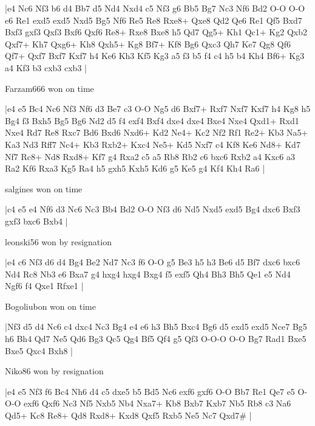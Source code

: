 \makegametitle
|e4 Nc6 Nf3 b6 d4 Bb7 d5 Nd4 Nxd4 c5 Nf3 g6 Bb5 Bg7 Nc3 Nf6 Bd2 O-O O-O e6 Re1 exd5 exd5 Nxd5 Bg5 Nf6 Re5 Re8 Rxe8+ Qxe8 Qd2 Qe6 Re1 Qf5 Bxd7 Bxf3 gxf3 Qxf3 Bxf6 Qxf6 Re8+ Rxe8 Bxe8 h5 Qd7 Qg5+ Kh1 Qc1+ Kg2 Qxb2 Qxf7+ Kh7 Qxg6+ Kh8 Qxh5+ Kg8 Bf7+ Kf8 Bg6 Qxc3 Qh7 Ke7 Qg8 Qf6 Qf7+ Qxf7 Bxf7 Kxf7 h4 Ke6 Kh3 Kf5 Kg3 a5 f3 b5 f4 c4 h5 b4 Kh4 Bf6+ Kg3 a4 Kf3 b3 cxb3 cxb3  |

\showboard

Farzam666 won on time

\makegametitle
|e4 e5 Bc4 Nc6 Nf3 Nf6 d3 Be7 c3 O-O Ng5 d6 Bxf7+ Rxf7 Nxf7 Kxf7 h4 Kg8 h5 Bg4 f3 Bxh5 Bg5 Bg6 Nd2 d5 f4 exf4 Bxf4 dxe4 dxe4 Bxe4 Nxe4 Qxd1+ Rxd1 Nxe4 Rd7 Re8 Rxc7 Bd6 Bxd6 Nxd6+ Kd2 Ne4+ Kc2 Nf2 Rf1 Re2+ Kb3 Na5+ Ka3 Nd3 Rff7 Nc4+ Kb3 Rxb2+ Kxc4 Ne5+ Kd5 Nxf7 c4 Kf8 Ke6 Nd8+ Kd7 Nf7 Rc8+ Nd8 Rxd8+ Kf7 g4 Rxa2 c5 a5 Rb8 Rb2 c6 bxc6 Rxb2 a4 Kxc6 a3 Ra2 Kf6 Rxa3 Kg5 Ra4 h5 gxh5 Kxh5 Kd6 g5 Ke5 g4 Kf4 Kh4 Ra6  |

\showboard

salgines won on time

\makegametitle
|c4 e5 e4 Nf6 d3 Nc6 Nc3 Bb4 Bd2 O-O Nf3 d6 Nd5 Nxd5 exd5 Bg4 dxc6 Bxf3 gxf3 bxc6 Bxb4  |

\showboard

leonski56 won by resignation

\makegametitle
|e4 c6 Nf3 d6 d4 Bg4 Be2 Nd7 Nc3 f6 O-O g5 Be3 h5 h3 Be6 d5 Bf7 dxc6 bxc6 Nd4 Rc8 Nb3 e6 Bxa7 g4 hxg4 hxg4 Bxg4 f5 exf5 Qh4 Bh3 Bh5 Qe1 e5 Nd4 Ngf6 f4 Qxe1 Rfxe1  |

\showboard

Bogoliubon won on time

\makegametitle
|Nf3 d5 d4 Nc6 c4 dxc4 Nc3 Bg4 e4 e6 h3 Bh5 Bxc4 Bg6 d5 exd5 exd5 Nce7 Bg5 h6 Bh4 Qd7 Ne5 Qd6 Bg3 Qc5 Qg4 Bf5 Qf4 g5 Qf3 O-O-O O-O Bg7 Rad1 Bxe5 Bxe5 Qxc4 Bxh8  |

\showboard

Niko86 won by resignation

\makegametitle
|e4 e5 Nf3 f6 Bc4 Nh6 d4 c5 dxe5 b5 Bd5 Nc6 exf6 gxf6 O-O Bb7 Re1 Qe7 e5 O-O-O exf6 Qxf6 Nc3 Nf5 Nxb5 Nb4 Nxa7+ Kb8 Bxb7 Kxb7 Nb5 Rb8 c3 Na6 Qd5+ Kc8 Re8+ Qd8 Rxd8+ Kxd8 Qxf5 Rxb5 Ne5 Nc7 Qxd7\#  |

